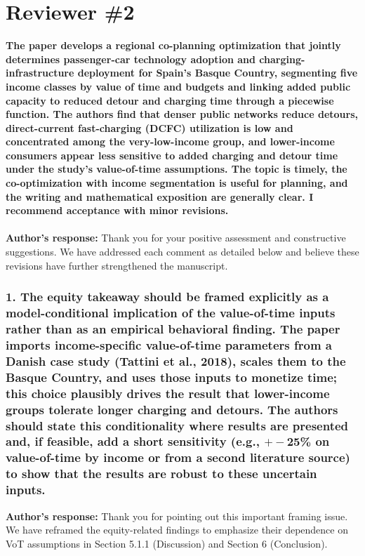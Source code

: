 \documentclass[11pt]{article}
\begin{document}
\section*{Reviewer \#2}
\textbf{The paper develops a regional co-planning optimization that jointly determines passenger-car technology adoption and charging-infrastructure deployment for Spain's Basque Country, segmenting five income classes by value of time and budgets and linking added public capacity to reduced detour and charging time through a piecewise function. The authors find that denser public networks reduce detours, direct-current fast-charging (DCFC) utilization is low and concentrated among the very-low-income group, and lower-income consumers appear less sensitive to added charging and detour time under the study's value-of-time assumptions. The topic is timely, the co-optimization with income segmentation is useful for planning, and the writing and mathematical exposition are generally clear. I recommend acceptance with minor revisions.} \\\\ 
\color{authorblue}\noindent \textcolor{authorblue}{\textbf{Author's response:}} 
Thank you for your positive assessment and constructive suggestions. We have addressed each comment as detailed below and believe these revisions have further strengthened the manuscript.
\\
\color{reviewergrey}
\subsubsection*{1. The equity takeaway should be framed explicitly as a model-conditional implication of the value-of-time inputs rather than as an empirical behavioral finding. The paper imports income-specific value-of-time parameters from a Danish case study (Tattini et al., 2018), scales them to the Basque Country, and uses those inputs to monetize time; this choice plausibly drives the result that lower-income groups tolerate longer charging and detours. The authors should state this conditionality where results are presented and, if feasible, add a short sensitivity (e.g., $+-$25\% on value-of-time by income or from a second literature source) to show that the results are robust to these uncertain inputs.}
\color{authorblue}
\noindent \textcolor{authorblue}{\textbf{Author's response:}} 
Thank you for pointing out this important framing issue. We have reframed the equity-related findings to emphasize their dependence on VoT assumptions in Section 5.1.1 (Discussion) and Section 6 (Conclusion).
\end{document}
